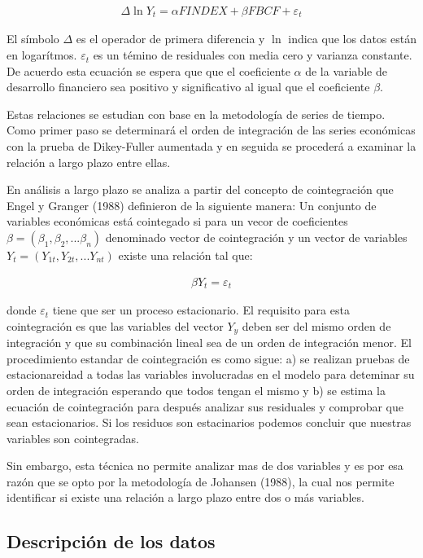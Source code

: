 \documentclass[]{AEA}
\begin{document}
\begin{align}
  \Delta \ln Y_{t}=\alpha FINDEX + \beta FBCF + \varepsilon _{t}
\end{align}

El símbolo \(\Delta\) es el operador de primera diferencia y \(\ln\)
indica que los datos están en logarítmos. \(\varepsilon _{t}\) es un
témino de residuales con media cero y varianza constante. De acuerdo
esta ecuación se espera que que el coeficiente \(\alpha\) de la variable
de desarrollo financiero sea positivo y significativo al igual que el
coeficiente \(\beta\).

Estas relaciones se estudian con base en la metodología de series de
tiempo. Como primer paso se determinará el orden de integración de las
series económicas con la prueba de Dikey-Fuller aumentada y en seguida
se procederá a examinar la relación a largo plazo entre ellas.

En análisis a largo plazo se analiza a partir del concepto de
cointegración que Engel y Granger (1988) definieron de la siguiente
manera: Un conjunto de variables económicas está cointegado si para un
vecor de coeficientes
\(\beta = \left (\beta_{1} , \beta _{2},...\beta _{n} \right )\)
denominado vector de cointegración y un vector de variables
\(Y_{t} = \left (Y_{1t} , Y _{2t},...Y_{nt} \right )\) existe una
relación tal que:

\begin{align}
  \beta Y_{t}=\varepsilon_{t}
\end{align}

donde \(\varepsilon_{t}\) tiene que ser un proceso estacionario. El
requisito para esta cointegración es que las variables del vector
\(Y_{y}\) deben ser del mismo orden de integración y que su combinación
lineal sea de un orden de integración menor. El procedimiento estandar
de cointegración es como sigue: a) se realizan pruebas de
estacionareidad a todas las variables involucradas en el modelo para
deteminar su orden de integración esperando que todos tengan el mismo y
b) se estima la ecuación de cointegración para después analizar sus
residuales y comprobar que sean estacionarios. Si los residuos son
estacinarios podemos concluir que nuestras variables son cointegradas.

Sin embargo, esta técnica no permite analizar mas de dos variables y es
por esa razón que se opto por la metodología de Johansen (1988), la cual
nos permite identificar si existe una relación a largo plazo entre dos o
más variables.

\hypertarget{descripcion-de-los-datos}{%
\subsection{Descripción de los datos}\label{descripcion-de-los-datos}}
\end{document}
